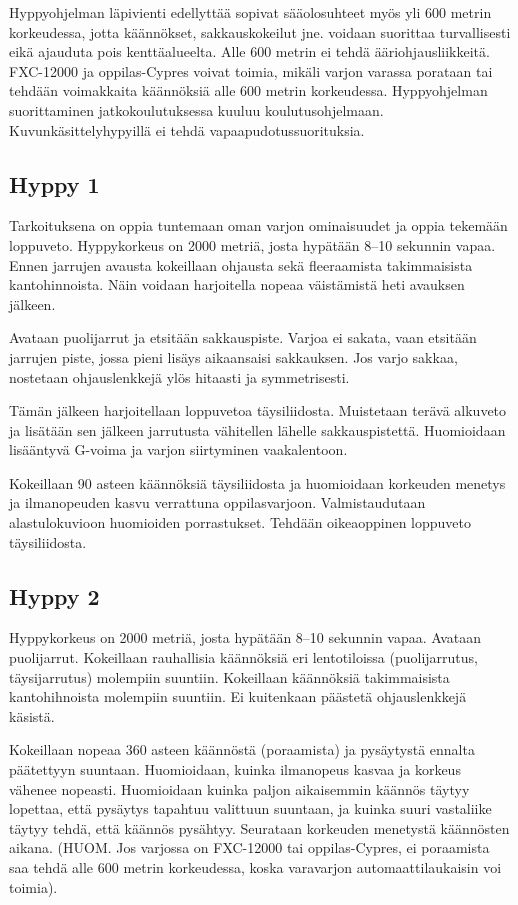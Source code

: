 Hyppyohjelman läpivienti edellyttää sopivat sääolosuhteet myös yli 600 metrin korkeudessa, jotta käännökset, sakkauskokeilut jne. voidaan suorittaa turvallisesti eikä ajauduta pois kenttäalueelta. Alle 600 metrin ei tehdä ääriohjausliikkeitä. FXC-12000 ja oppilas-Cypres voivat toimia, mikäli varjon varassa porataan tai tehdään voimakkaita käännöksiä alle 600 metrin korkeudessa. Hyppyohjelman suorittaminen jatkokoulutuksessa kuuluu koulutusohjelmaan. Kuvunkäsittelyhypyillä ei tehdä vapaapudotussuorituksia. 

\subsection{ Hyppy 1 }
\label{kuvunkasittely-oppilaana-hyppy-1}


Tarkoituksena on oppia tuntemaan oman varjon ominaisuudet ja oppia tekemään loppuveto. Hyppykorkeus on 2000 metriä, josta hypätään 8–10 sekunnin vapaa. Ennen jarrujen avausta kokeillaan ohjausta sekä fleeraamista takimmaisista kantohinnoista. Näin voidaan harjoitella nopeaa väistämistä heti avauksen jälkeen. 


Avataan puolijarrut ja etsitään sakkauspiste. Varjoa ei sakata, vaan etsitään jarrujen piste, jossa pieni lisäys aikaansaisi sakkauksen. Jos varjo sakkaa, nostetaan ohjauslenkkejä ylös hitaasti ja symmetrisesti.  


Tämän jälkeen harjoitellaan loppuvetoa täysiliidosta. Muistetaan terävä alkuveto ja lisätään sen jälkeen jarrutusta vähitellen lähelle sakkauspistettä. Huomioidaan lisääntyvä G-voima ja varjon siirtyminen vaakalentoon. 


Kokeillaan 90 asteen käännöksiä täysiliidosta ja huomioidaan korkeuden menetys ja ilmanopeuden kasvu verrattuna oppilasvarjoon. Valmistaudutaan alastulokuvioon huomioiden porrastukset. Tehdään oikeaoppinen loppuveto täysiliidosta. 

\subsection{ Hyppy 2 }
\label{kuvunkasittely-oppilaana-hyppy-2}


Hyppykorkeus on 2000 metriä, josta hypätään 8–10 sekunnin vapaa. Avataan puolijarrut. Kokeillaan rauhallisia käännöksiä eri lentotiloissa (puolijarrutus, täysijarrutus) molempiin suuntiin. Kokeillaan käännöksiä takimmaisista kantohihnoista molempiin suuntiin. Ei kuitenkaan päästetä ohjauslenkkejä käsistä. 


Kokeillaan nopeaa 360 asteen käännöstä (poraamista) ja pysäytystä ennalta päätettyyn suuntaan. Huomioidaan, kuinka ilmanopeus kasvaa ja korkeus vähenee nopeasti. Huomioidaan kuinka paljon aikaisemmin käännös täytyy lopettaa, että pysäytys tapahtuu valittuun suuntaan, ja kuinka suuri vastaliike täytyy tehdä, että käännös pysähtyy. Seurataan korkeuden menetystä käännösten aikana. (HUOM. Jos varjossa on FXC-12000 tai oppilas-Cypres, ei poraamista saa tehdä alle 600 metrin korkeudessa, koska varavarjon automaattilaukaisin voi toimia). 


